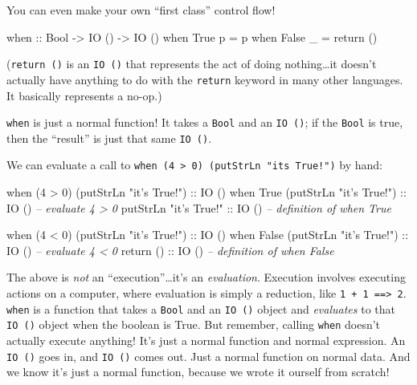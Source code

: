 \documentclass[]{article}
\newenvironment{Shaded}{}{}
\newcommand{\DataTypeTok}[1]{\textcolor[rgb]{0.56,0.13,0.00}{{#1}}}
\newcommand{\DecValTok}[1]{\textcolor[rgb]{0.25,0.63,0.44}{{#1}}}
\newcommand{\StringTok}[1]{\textcolor[rgb]{0.25,0.44,0.63}{{#1}}}
\newcommand{\CommentTok}[1]{\textcolor[rgb]{0.38,0.63,0.69}{\textit{{#1}}}}
\newcommand{\OtherTok}[1]{\textcolor[rgb]{0.00,0.44,0.13}{{#1}}}
\newcommand{\FunctionTok}[1]{\textcolor[rgb]{0.02,0.16,0.49}{{#1}}}
\newcommand{\NormalTok}[1]{{#1}}
\begin{document}
You can even make your own ``first class'' control flow!

\begin{Shaded}
\begin{Highlighting}[]
\OtherTok{when ::} \DataTypeTok{Bool} \OtherTok{->} \DataTypeTok{IO} \NormalTok{() }\OtherTok{->} \DataTypeTok{IO} \NormalTok{()}
\NormalTok{when }\DataTypeTok{True}  \NormalTok{p }\FunctionTok{=} \NormalTok{p}
\NormalTok{when }\DataTypeTok{False} \NormalTok{_ }\FunctionTok{=} \NormalTok{return ()}
\end{Highlighting}
\end{Shaded}

(\texttt{return\ ()} is an \texttt{IO\ ()} that represents the act of doing
nothing\ldots{}it doesn't actually have anything to do with the \texttt{return}
keyword in many other languages. It basically represents a no-op.)

\texttt{when} is just a normal function! It takes a \texttt{Bool} and an
\texttt{IO\ ()}; if the \texttt{Bool} is true, then the ``result'' is just that
same \texttt{IO\ ()}.

We can evaluate a call to
\texttt{when\ (4\ \textgreater{}\ 0)\ (putStrLn\ "it\textquotesingle{}s\ True!")}
by hand:

\begin{Shaded}
\begin{Highlighting}[]
\NormalTok{when (}\DecValTok{4} \FunctionTok{>} \DecValTok{0}\NormalTok{) (putStrLn }\StringTok{"it's True!"}\NormalTok{)}\OtherTok{ ::} \DataTypeTok{IO} \NormalTok{()}
\NormalTok{when }\DataTypeTok{True} \NormalTok{(putStrLn }\StringTok{"it's True!"}\NormalTok{)}\OtherTok{    ::} \DataTypeTok{IO} \NormalTok{()  }\CommentTok{-- evaluate 4 > 0}
\NormalTok{putStrLn }\StringTok{"it's True!"}\OtherTok{                ::} \DataTypeTok{IO} \NormalTok{()  }\CommentTok{-- definition of when True}

\NormalTok{when (}\DecValTok{4} \FunctionTok{<} \DecValTok{0}\NormalTok{) (putStrLn }\StringTok{"it's True!"}\NormalTok{)}\OtherTok{ ::} \DataTypeTok{IO} \NormalTok{()}
\NormalTok{when }\DataTypeTok{False} \NormalTok{(putStrLn }\StringTok{"it's True!"}\NormalTok{)}\OtherTok{   ::} \DataTypeTok{IO} \NormalTok{()  }\CommentTok{-- evaluate 4 < 0}
\NormalTok{return}\OtherTok{ ()                            ::} \DataTypeTok{IO} \NormalTok{()  }\CommentTok{-- definition of when False}
\end{Highlighting}
\end{Shaded}

The above is \emph{not} an ``execution''\ldots{}it's an \emph{evaluation}.
Execution involves executing actions on a computer, where evaluation is simply a
reduction, like \texttt{1\ +\ 1\ ==\textgreater{}\ 2}. \texttt{when} is a
function that takes a \texttt{Bool} and an \texttt{IO\ ()} object and
\emph{evaluates} to that \texttt{IO\ ()} object when the boolean is True. But
remember, calling \texttt{when} doesn't actually execute anything! It's just a
normal function and normal expression. An \texttt{IO\ ()} goes in, and
\texttt{IO\ ()} comes out. Just a normal function on normal data. And we know
it's just a normal function, because we wrote it ourself from scratch!
\end{document}
